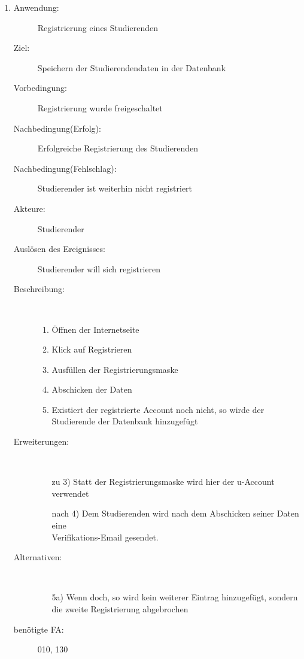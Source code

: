 \documentclass[parskip=full]{scrartcl}
\newcommand{\swtLabel}[1]{\textbf{/#1\arabic*0/}}
\begin{document}
\begin{enumerate}[label=\swtLabel{S}]
	\item
    \begin{description}
  	\item[Anwendung:] Registrierung eines Studierenden
  	\item[Ziel:] Speichern der Studierendendaten in der Datenbank
  	\item[Vorbedingung:] Registrierung wurde freigeschaltet
  	\item[Nachbedingung(Erfolg):] Erfolgreiche Registrierung des Studierenden
  	\item[Nachbedingung(Fehlschlag):] Studierender ist weiterhin nicht
  	registriert
  	\item[Akteure:] Studierender
  	\item[Auslösen des Ereignisses:] Studierender will sich registrieren
  	\item[Beschreibung:]~
  	\begin{enumerate}
  	  \item Öffnen der Internetseite
      \item Klick auf Registrieren
      \item Ausfüllen der Registrierungsmaske
      \item Abschicken der Daten
      \item Existiert der registrierte Account noch nicht, so wirde der Studierende
      der Datenbank hinzugefügt
  	\end{enumerate}
  	\item[Erweiterungen:]~
  	\begin{enumerate}
  	  \item[zu 3)] Statt der Registrierungsmaske wird hier der u-Account
  	  verwendet
  	  \item[nach 4)] Dem Studierenden wird nach dem Abschicken seiner Daten eine
  	  \\
  	  Verifikations-Email gesendet.
  	 \end{enumerate} 
  	\item[Alternativen:]~
  	\begin{enumerate}
  	  \item[5a)] Wenn doch, so wird kein weiterer Eintrag hinzugefügt, sondern
  	  die zweite Registrierung abgebrochen
  	\end{enumerate} 
  	\item[benötigte FA:] 010, 130
  \end{description}
%   
  

\end{enumerate}
\end{document}
